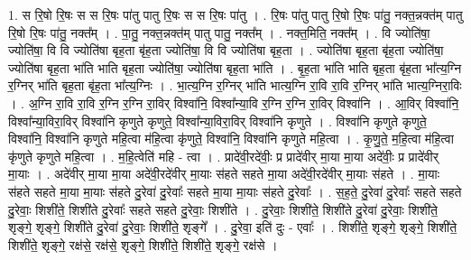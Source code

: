 \documentclass[17pt]{extarticle}
\begin{document}
1. स रि॒षो रि॒षः स स रि॒षः पा॑तु पातु रि॒षः स स रि॒षः पा॑तु । . रि॒षः पा॑तु पातु रि॒षो रि॒षः पा॑तु॒ नक्त॒न्नक्त॑म् पातु रि॒षो रि॒षः पा॑तु॒ नक्त᳚म् । . पा॒तु॒ नक्त॒न्नक्त॑म् पातु पातु॒ नक्त᳚म् । . नक्त॒मिति॒ नक्त᳚म् । . वि ज्योति॑षा॒ ज्योति॑षा॒ वि वि ज्योति॑षा बृह॒ता बृ॑ह॒ता ज्योति॑षा॒ वि वि ज्योति॑षा बृह॒ता । . ज्योति॑षा बृह॒ता बृ॑ह॒ता ज्योति॑षा॒ ज्योति॑षा बृह॒ता भा॑ति भाति बृह॒ता ज्योति॑षा॒ ज्योति॑षा बृह॒ता भा॑ति । . बृ॒ह॒ता भा॑ति भाति बृह॒ता बृ॑ह॒ता भा᳚त्य॒ग्नि र॒ग्निर् भा॑ति बृह॒ता बृ॑ह॒ता भा᳚त्य॒ग्निः । . भा॒त्य॒ग्नि र॒ग्निर् भा॑ति भात्य॒ग्नि रा॒वि रा॒वि र॒ग्निर् भा॑ति भात्य॒ग्निरा॒विः । . अ॒ग्नि रा॒वि रा॒वि र॒ग्नि र॒ग्नि रा॒विर् विश्वा॑नि॒ विश्वा᳚न्या॒वि र॒ग्नि र॒ग्नि रा॒विर् विश्वा॑नि । . आ॒विर् विश्वा॑नि॒ विश्वा᳚न्या॒विरा॒विर् विश्वा॑नि कृणुते कृणुते॒ विश्वा᳚न्या॒विरा॒विर् विश्वा॑नि कृणुते । . विश्वा॑नि कृणुते कृणुते॒ विश्वा॑नि॒ विश्वा॑नि कृणुते महि॒त्वा म॑हि॒त्वा कृ॑णुते॒ विश्वा॑नि॒ विश्वा॑नि कृणुते महि॒त्वा । . कृ॒णु॒ते॒ म॒हि॒त्वा म॑हि॒त्वा कृ॑णुते कृणुते महि॒त्वा । . म॒हि॒त्वेति॑ महि - त्वा । . प्रादे॑वी॒रदे॑वीः॒ प्र प्रादे॑वीर् मा॒या मा॒या अदे॑वीः॒ प्र प्रादे॑वीर् मा॒याः । . अदे॑वीर् मा॒या मा॒या अदे॑वी॒रदे॑वीर् मा॒याः स॑हते सहते मा॒या अदे॑वी॒रदे॑वीर् मा॒याः स॑हते । . मा॒याः स॑हते सहते मा॒या मा॒याः स॑हते दु॒रेवा॑ दु॒रेवाः᳚ सहते मा॒या मा॒याः स॑हते दु॒रेवाः᳚ । . स॒ह॒ते॒ दु॒रेवा॑ दु॒रेवाः᳚ सहते सहते दु॒रेवाः॒ शिशी॑ते॒ शिशी॑ते दु॒रेवाः᳚ सहते सहते दु॒रेवाः॒ शिशी॑ते । . दु॒रेवाः॒ शिशी॑ते॒ शिशी॑ते दु॒रेवा॑ दु॒रेवाः॒ शिशी॑ते॒ शृङ्गे॒ शृङ्गे॒ शिशी॑ते दु॒रेवा॑ दु॒रेवाः॒ शिशी॑ते॒ शृङ्गे᳚ । . दु॒रेवा॒ इति॑ दुः - एवाः᳚ । . शिशी॑ते॒ शृङ्गे॒ शृङ्गे॒ शिशी॑ते॒ शिशी॑ते॒ शृङ्गे॒ रक्ष॑से॒ रक्ष॑से॒ शृङ्गे॒ शिशी॑ते॒ शिशी॑ते॒ शृङ्गे॒ रक्ष॑से । \newline
\end{document}
